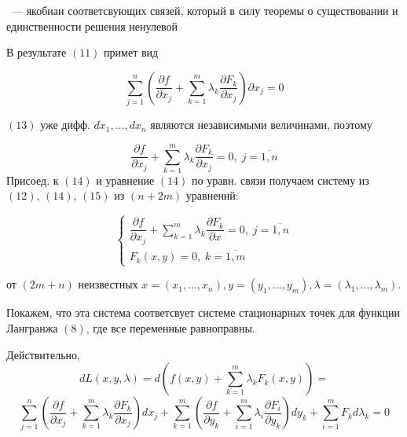 \documentclass[../../main.tex]{subfiles}
\begin{document}
	~--- якобиан соответсвующих связей, который в силу теоремы о существовании
	и единственности решения ненулевой 
	
	
	В результате $\left( 11 \right)$ %
	примет вид
	
	\begin{equation}
	\label{QQQQQQQQQQQQQQQQQQQQQQQQQQQQQQQQQQkek_label_2}
	\sum\limits_{j=1}^{n}\left(  \dfrac{\partial f }{\partial x_j} + 
	\sum\limits_{k=1}^{m} \lambda_k\dfrac{\partial F_k }{\partial x_j}  
	\right) \partial x_j =0 
	\end{equation}
	
	$\left( 13 \right) $ %
	уже дифф. %
	$d x_1,\ldots,d x_n$ являются независимыми величинами, поэтому
	
	\[\dfrac{\partial f }{\partial x_j} + \sum\limits_{k=1}^{m}
	\lambda_k \dfrac{\partial F_k }{\partial x_j} = 0,\; j = \overline{1, n}
	\]
	Присоед. к $\left( 14 \right) $ и уравнение $\left( 14 \right) $ по 
	уравн. связи получаем \smallskip систему из $\left( 12 \right) $, 
	$\left( 14 \right) $,
	$\left( 15 \right) $ из $ \left( n + 2m \right) $ уравнений:
	
	\begin{equation}
	\begin{cases}
	\dfrac{\partial f }{\partial x_j} + \sum\limits_{k=1}^{m}
	\lambda_k \dfrac{\partial F_k }{\partial x} = 0,\; j = \overline{1, n}\\
	F_k\left( x, y \right) = 0,\; k = \overline{1, m}
	\end{cases}
	\end{equation}
	
	от $ \left( 2m + n \right) $ неизвестных $x = \left( x_1, \ldots, x_n \right),
	y = \left( y_1, \ldots, y_m \right), \lambda = \left( \lambda_1,
	\ldots, \lambda_m \right) $.
	
	Покажем, что эта система соответсвует системе стационарных точек для
	функции Лангранжа $\left( 8 \right) $, где все переменные равноправны.
	
	Действительно, 
	\[dL\left( x, y, \lambda \right) = d\left( f\left( x, y\right) 
	+ \sum\limits_{k=1}^{m}\lambda_k F_k\left( x, y \right) \right) =\]
	\[
	\sum\limits_{j=1}^{n}\left( \dfrac{\partial f}{\partial x_j} 
	+ \sum\limits_{k=1}^{m}\lambda_k \dfrac{\partial F_k}{\partial x_j}  
	\right)d x_j + \sum\limits_{k=1}^{m} \left( \dfrac{\partial f}{\partial y_k} 
	+ \sum\limits_{i=1}^{m}\lambda_i \dfrac{\partial F_i}{\partial y_k}  \right)
	d 	y_k + \sum\limits_{i=1}^{m} F_k d \lambda_k = 0\]
	
\end{document}
